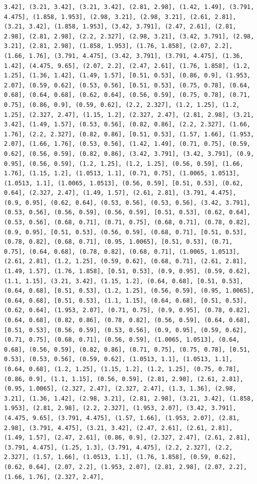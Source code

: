 \documentclass[12pt,fleqn]{article}\usepackage{../common}
\begin{document}
\begin{verbatim}
3.42], (3.21, 3.42], (3.21, 3.42], (2.81, 2.98], (1.42, 1.49], (3.791, 4.475], (1.858, 1.953], (2.98, 3.21], (2.98, 3.21], (2.61, 2.81], (3.21, 3.42], (1.858, 1.953], (3.42, 3.791], (2.47, 2.61], (2.81, 2.98], (2.81, 2.98], (2.2, 2.327], (2.98, 3.21], (3.42, 3.791], (2.98, 3.21], (2.81, 2.98], (1.858, 1.953], (1.76, 1.858], (2.07, 2.2], (1.66, 1.76], (3.791, 4.475], (3.42, 3.791], (3.791, 4.475], (1.36, 1.42], (4.475, 9.65], (2.07, 2.2], (2.47, 2.61], (1.76, 1.858], (1.2, 1.25], (1.36, 1.42], (1.49, 1.57], [0.51, 0.53], (0.86, 0.9], (1.953, 2.07], (0.59, 0.62], (0.53, 0.56], [0.51, 0.53], (0.75, 0.78], (0.64, 0.68], (0.64, 0.68], (0.62, 0.64], (0.56, 0.59], (0.75, 0.78], (0.71, 0.75], (0.86, 0.9], (0.59, 0.62], (2.2, 2.327], (1.2, 1.25], (1.2, 1.25], (2.327, 2.47], (1.15, 1.2], (2.327, 2.47], (2.81, 2.98], (3.21, 3.42], (1.49, 1.57], (0.53, 0.56], (0.82, 0.86], (2.2, 2.327], (1.66, 1.76], (2.2, 2.327], (0.82, 0.86], [0.51, 0.53], (1.57, 1.66], (1.953, 2.07], (1.66, 1.76], (0.53, 0.56], (1.42, 1.49], (0.71, 0.75], (0.59, 0.62], (0.56, 0.59], (0.82, 0.86], (3.42, 3.791], (3.42, 3.791], (0.9, 0.95], (0.56, 0.59], (1.2, 1.25], (1.2, 1.25], (0.56, 0.59], (1.66, 1.76], (1.15, 1.2], (1.0513, 1.1], (0.71, 0.75], (1.0065, 1.0513], (1.0513, 1.1], (1.0065, 1.0513], (0.56, 0.59], [0.51, 0.53], (0.62, 0.64], (2.327, 2.47], (1.49, 1.57], (2.61, 2.81], (3.791, 4.475], (0.9, 0.95], (0.62, 0.64], (0.53, 0.56], (0.53, 0.56], (3.42, 3.791], (0.53, 0.56], (0.56, 0.59], (0.56, 0.59], [0.51, 0.53], (0.62, 0.64], (0.53, 0.56], (0.68, 0.71], (0.71, 0.75], (0.68, 0.71], (0.78, 0.82], (0.9, 0.95], [0.51, 0.53], (0.56, 0.59], (0.68, 0.71], [0.51, 0.53], (0.78, 0.82], (0.68, 0.71], (0.95, 1.0065], [0.51, 0.53], (0.71, 0.75], (0.64, 0.68], (0.78, 0.82], (0.68, 0.71], (1.0065, 1.0513], (2.61, 2.81], (1.2, 1.25], (0.59, 0.62], (0.68, 0.71], (2.61, 2.81], (1.49, 1.57], (1.76, 1.858], [0.51, 0.53], (0.9, 0.95], (0.59, 0.62], (1.1, 1.15], (3.21, 3.42], (1.15, 1.2], (0.64, 0.68], [0.51, 0.53], (0.64, 0.68], [0.51, 0.53], (1.2, 1.25], (0.56, 0.59], (0.95, 1.0065], (0.64, 0.68], [0.51, 0.53], (1.1, 1.15], (0.64, 0.68], [0.51, 0.53], (0.62, 0.64], (1.953, 2.07], (0.71, 0.75], (0.9, 0.95], (0.78, 0.82], (0.64, 0.68], (0.82, 0.86], (0.78, 0.82], (0.56, 0.59], (0.64, 0.68], [0.51, 0.53], (0.56, 0.59], (0.53, 0.56], (0.9, 0.95], (0.59, 0.62], (0.71, 0.75], (0.68, 0.71], (0.56, 0.59], (1.0065, 1.0513], (0.64, 0.68], (0.56, 0.59], (0.82, 0.86], (0.71, 0.75], (0.75, 0.78], [0.51, 0.53], (0.53, 0.56], (0.59, 0.62], (1.0513, 1.1], (1.0513, 1.1], (0.64, 0.68], (1.2, 1.25], (1.15, 1.2], (1.2, 1.25], (0.75, 0.78], (0.86, 0.9], (1.1, 1.15], (0.56, 0.59], (2.81, 2.98], (2.61, 2.81], (0.95, 1.0065], (2.327, 2.47], (2.327, 2.47], (1.3, 1.36], (2.98, 3.21], (1.36, 1.42], (2.98, 3.21], (2.81, 2.98], (3.21, 3.42], (1.858, 1.953], (2.81, 2.98], (2.2, 2.327], (1.953, 2.07], (3.42, 3.791], (4.475, 9.65], (3.791, 4.475], (1.57, 1.66], (1.953, 2.07], (2.81, 2.98], (3.791, 4.475], (3.21, 3.42], (2.47, 2.61], (2.61, 2.81], (1.49, 1.57], (2.47, 2.61], (0.86, 0.9], (2.327, 2.47], (2.61, 2.81], (3.791, 4.475], (1.25, 1.3], (3.791, 4.475], (2.2, 2.327], (2.2, 2.327], (1.57, 1.66], (1.0513, 1.1], (1.76, 1.858], (0.59, 0.62], (0.62, 0.64], (2.07, 2.2], (1.953, 2.07], (2.81, 2.98], (2.07, 2.2], (1.66, 1.76], (2.327, 2.47], 
\end{verbatim}
\end{document}
